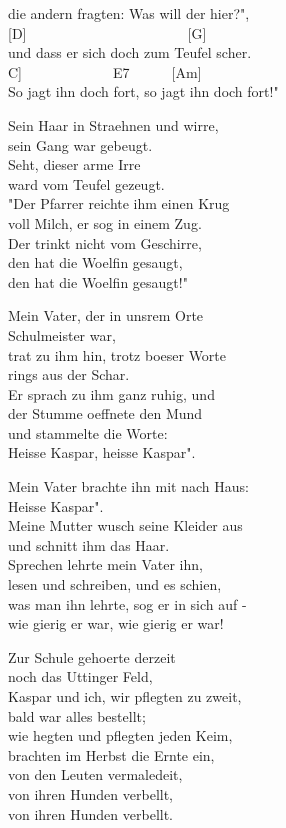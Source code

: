 \documentclass[
  letterpaper,
]{scrbook}
\begin{document}
die andern fragten: Was will der hier?",\\
{[}D{]}~~~~~~~~~~~~~~~~~~~~~~~{[}G{]}\\
und dass er sich doch zum Teufel scher\textquotesingle.\\
\hspace*{0.333em}\hspace*{0.333em}\hspace*{0.333em}\hspace*{0.333em}{[}C{]}~~~~~~~~~~~~~E7~~~~~~{[}Am{]}\\
So jagt ihn doch fort, so jagt ihn doch fort!"

Sein Haar in Straehnen und wirre,\\
sein Gang war gebeugt.\\
Seht, dieser arme Irre\\
ward vom Teufel gezeugt.\\
"Der Pfarrer reichte ihm einen Krug\\
voll Milch, er sog in einem Zug.\\
Der trinkt nicht vom Geschirre,\\
den hat die Woelfin gesaugt,\\
den hat die Woelfin gesaugt!"

Mein Vater, der in uns\textquotesingle rem Orte\\
Schulmeister war,\\
trat zu ihm hin, trotz boeser Worte\\
rings aus der Schar.\\
Er sprach zu ihm ganz ruhig, und\\
der Stumme oeffnete den Mund\\
und stammelte die Worte:\\
Heisse Kaspar, heisse Kaspar".

Mein Vater brachte ihn mit nach Haus:\\
Heisse Kaspar".\\
Meine Mutter wusch seine Kleider aus\\
und schnitt ihm das Haar.\\
Sprechen lehrte mein Vater ihn,\\
lesen und schreiben, und es schien,\\
was man ihn lehrte, sog er in sich auf -\\
wie gierig er war, wie gierig er war!

Zur Schule gehoerte derzeit\\
noch das Uttinger Feld,\\
Kaspar und ich, wir pflegten zu zweit,\\
bald war alles bestellt;\\
wie hegten und pflegten jeden Keim,\\
brachten im Herbst die Ernte ein,\\
von den Leuten vermaledeit,\\
von ihren Hunden verbellt,\\
von ihren Hunden verbellt.
\end{document}
